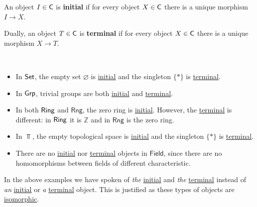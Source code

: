 \documentclass[../../main]{subfiles}
\begin{document}
\begin{definition}\label{def:initial-terminal-object}
  An object \(I \in \mathsf{C}\) is \textbf{initial} if for every object \(X \in \mathsf{C}\) there is a unique morphism \(I \to X\).

  Dually, an object \(T \in \mathsf{C}\) is \textbf{terminal} if for every object \(X \in \mathsf{C}\) there is a unique morphism \(X \to T\).
\end{definition}

\begin{example}~
  \begin{itemize}
    \item In \(\mathsf{Set}\), the empty set \(\varnothing\) is \hyperref[def:initial-terminal-object]{initial} and the singleton \(\{\ast\}\) is \hyperref[def:initial-terminal-object]{terminal}.
    \item In \(\mathsf{Grp}\), trivial groups are both \hyperref[def:initial-terminal-object]{initial} and \hyperref[def:initial-terminal-object]{terminal}.
    \item In both \(\mathsf{Ring}\) and \(\mathsf{Rng}\), the zero ring is \hyperref[def:initial-terminal-object]{initial}.
          However, the \hyperref[def:initial-terminal-object]{terminal} is different: in \(\mathsf{Ring}\) it is \(\mathbb{Z}\) and in \(\mathsf{Rng}\) is the zero ring.
    \item In \(\Top\), the empty topological space is \hyperref[def:initial-terminal-object]{initial} and the singleton \(\{\ast\}\) is \hyperref[def:initial-terminal-object]{terminal}.
    \item There are no \hyperref[def:initial-terminal-object]{initial} nor \hyperref[def:initial-terminal-object]{terminal} objects in \(\mathsf{Field}\), since there are no homomorphisms between fields of different characteristic.
  \end{itemize}
\end{example}

In the above examples we have spoken of \textit{the} \hyperref[def:initial-terminal-object]{initial} and \textit{the} \hyperref[def:initial-terminal-object]{terminal} instead of \textit{an} \hyperref[def:initial-terminal-object]{initial} or  \textit{a} \hyperref[def:initial-terminal-object]{terminal} object.
This is justified as these types of objects are \hyperref[def:categorical-isomorphism]{isomorphic}.
\end{document}

